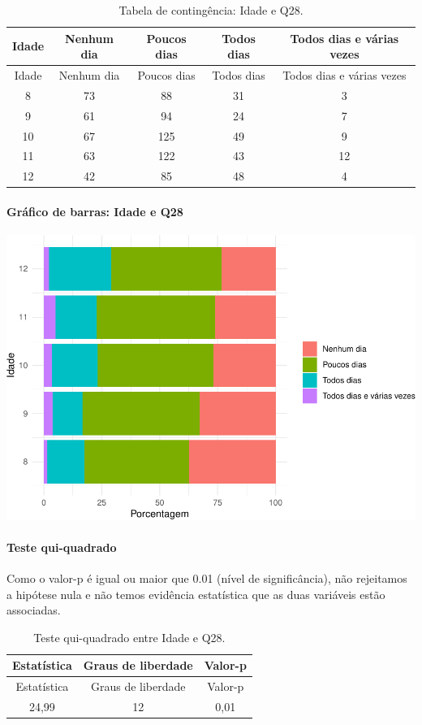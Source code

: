 \documentclass[]{article}
\let\oldparagraph\paragraph
\renewcommand{\paragraph}[1]{\oldparagraph{#1}\mbox{}}
\begin{document}
\begin{longtable}[]{@{}ccccc@{}}
\caption{\label{tab:unnamed-chunk-859}Tabela de contingência: Idade e Q28.}\tabularnewline
\toprule
Idade & Nenhum dia & Poucos dias & Todos dias & Todos dias e várias vezes\tabularnewline
\midrule
\endfirsthead
\toprule
Idade & Nenhum dia & Poucos dias & Todos dias & Todos dias e várias vezes\tabularnewline
\midrule
\endhead
8 & 73 & 88 & 31 & 3\tabularnewline
9 & 61 & 94 & 24 & 7\tabularnewline
10 & 67 & 125 & 49 & 9\tabularnewline
11 & 63 & 122 & 43 & 12\tabularnewline
12 & 42 & 85 & 48 & 4\tabularnewline
\bottomrule
\end{longtable}

\hypertarget{gruxe1fico-de-barras-idade-e-q28}{%
\paragraph{Gráfico de barras: Idade e Q28}\label{gruxe1fico-de-barras-idade-e-q28}}

\begin{center}\includegraphics[width=0.75\linewidth]{relatorio_covid19_files/figure-latex/unnamed-chunk-860-1} \end{center}

\hypertarget{teste-qui-quadrado-74}{%
\paragraph{Teste qui-quadrado}\label{teste-qui-quadrado-74}}

Como o valor-p é igual ou maior que 0.01 (nível de significância), não rejeitamos a hipótese nula e não temos evidência estatística que as duas variáveis estão associadas.

\begin{longtable}[]{@{}ccc@{}}
\caption{\label{tab:unnamed-chunk-862}Teste qui-quadrado entre Idade e Q28.}\tabularnewline
\toprule
Estatística & Graus de liberdade & Valor-p\tabularnewline
\midrule
\endfirsthead
\toprule
Estatística & Graus de liberdade & Valor-p\tabularnewline
\midrule
\endhead
24,99 & 12 & 0,01\tabularnewline
\bottomrule
\end{longtable}
\end{document}
